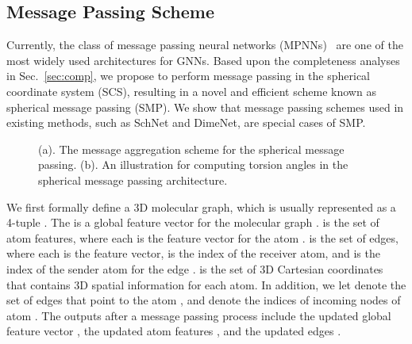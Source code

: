 \documentclass{article}
\begin{document}
\subsection{Message Passing Scheme}
Currently, the class of message passing neural networks (MPNNs)~\citep{gilmer2017neural}
are one of the most widely used architectures for GNNs.
Based upon the completeness analyses in Sec.~\ref{sec:comp},
we propose to perform message passing in the spherical coordinate system (SCS), resulting in a novel and efficient scheme known as spherical message passing (SMP).
We show that message passing schemes used in existing methods, 
such as SchNet and DimeNet,
are special cases of SMP.


\begin{figure*}[t]
     \centering
     \qquad\quad
     \vspace{-10 pt}
    \caption{(a). The message aggregation scheme for the spherical message passing.
    (b). An illustration for computing torsion angles in the spherical message passing architecture.}
    \label{fig:sphere}
    \vspace{-12 pt}
\end{figure*}

We first formally define a 3D molecular graph, which is usually represented as a 4-tuple .
The  is a global feature vector for the molecular graph .  is the set of atom features, where each  is the feature vector for the atom .
 is the set of edges, where each  is the feature vector, 
 is the index of the receiver atom, and  is the index of the sender atom for the edge . 
 is the set of 3D Cartesian coordinates that
contains 3D spatial information for each atom.
In addition, we let
 denote
the set of edges that point to the atom , 
and  denote the indices of incoming nodes of atom .
The outputs after a message passing process include the updated global feature vector ,
the updated atom features ,
and the updated edges .
\end{document}
